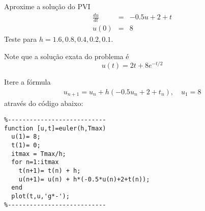 \begin{ex}
Aproxime a solução do PVI
\begin{eqnarray}
   \frac{du}{dt} &=& -0.5u+2+t\\
            u(0) &=&  8
\end{eqnarray}
Teste para $h=1.6, 0.8, 0.4, 0.2, 0.1$.

Note que a solução exata do problema é
\begin{equation}
     u(t) = 2t+8e^{-t/2}
\end{equation}

Itere a fórmula
\begin{eqnarray}
  u_{n+1}=u_n + h( -0.5u_n+2+t_n), \quad  u_1=8
\end{eqnarray}
através do código abaixo:

\begin{verbatim}
%---------------------------
function [u,t]=euler(h,Tmax)
  u(1)= 8;
  t(1)= 0;
  itmax = Tmax/h;
  for n=1:itmax
    t(n+1)= t(n) + h;
    u(n+1)= u(n) + h*(-0.5*u(n)+2+t(n));
  end
  plot(t,u,'g*-');
%---------------------------
\end{verbatim}


\end{ex}


